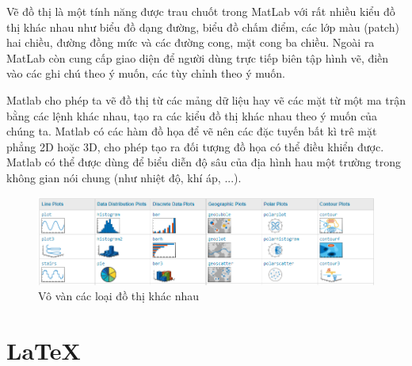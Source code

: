 \documentclass[12pt,a4paper]{report}
\begin{document}
    Vẽ đồ thị là một tính năng được trau chuốt trong MatLab với rất nhiều kiểu đồ thị khác nhau như biểu đồ dạng đường, biểu đồ chấm điểm, các lớp màu (patch) hai chiều, đường đồng mức và các đường cong, mặt cong ba chiều. Ngoài ra MatLab còn cung cấp giao diện để người dùng trực tiếp biên tập hình vẽ, điền vào các ghi chú theo ý muốn, các tùy chỉnh theo ý muốn. 
    	
    Matlab cho phép ta vẽ đồ thị từ các mảng dữ liệu hay vẽ các mặt từ một ma trận bằng các lệnh khác nhau, tạo ra các kiểu đồ thị khác nhau theo ý muốn của chúng ta. Matlab có các hàm đồ họa để vẽ nên các đặc tuyến bất kì trê mặt phẳng 2D hoặc 3D, cho phép tạo ra đối tượng đồ họa có thể điều khiển được. Matlab có thể được dùng để biểu diễn độ sâu của địa hình hau một trường trong không gian nói chung (như nhiệt độ, khí áp, ...).
    
   \begin{figure}[h]
    	\centering
    		\includegraphics[scale=0.6]{graphType.png}
    		\caption{Vô vàn các loại đồ thị khác nhau}
    \end{figure}
 
    \section{\LaTeX}
    
\end{document}
